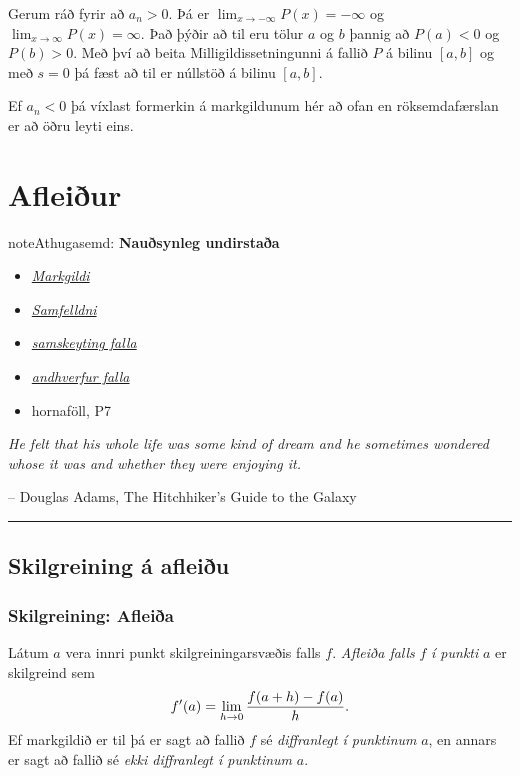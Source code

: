 \documentclass[b5paper,10pt,icelandic]{sphinxmanual}
\begin{document}
Gerum ráð fyrir að \(a_n>0\). Þá er
\(\lim_{x\to -\infty} P(x) = -\infty\) og
\(\lim_{x\to \infty} P(x) = \infty\). Það þýðir að til eru tölur
\(a\) og \(b\) þannig að \(P(a)<0\) og \(P(b)>0\). Með
því að beita Milligildissetningunni á fallið \(P\) á bilinu
\([a,b]\) og með \(s=0\) þá fæst að til er núllstöð á bilinu
\([a,b]\).

Ef \(a_n < 0\) þá víxlast formerkin á markgildunum hér að ofan en röksemdafærslan er
að öðru leyti eins.


\chapter{Afleiður}
\label{kafli03::doc}\label{kafli03:afleiur}
\begin{notice}{note}{Athugasemd:}
\textbf{Nauðsynleg undirstaða}
\begin{itemize}
\item {} 
{\hyperref[kafli02:markgildi]{\emph{Markgildi}}}

\item {} 
{\hyperref[kafli02:samfelldni]{\emph{Samfelldni}}}

\item {} 
{\hyperref[kafli01:samskeyting]{\emph{samskeyting falla}}}

\item {} 
{\hyperref[kafli01:andhverfa]{\emph{andhverfur falla}}}

\item {} 
hornaföll, P7

\end{itemize}
\end{notice}

\emph{He felt that his whole life was some kind of dream and he sometimes wondered whose it was and whether they were enjoying it.}

-- Douglas Adams, The Hitchhiker's Guide to the Galaxy


\bigskip\hrule{}\bigskip



\section{Skilgreining á afleiðu}
\label{kafli03:afleidur}\label{kafli03:skilgreining-a-afleiu}\label{kafli03:index-0}

\subsection{Skilgreining: Afleiða}
\label{kafli03:skilgreining-afleia}
Látum \(a\) vera innri punkt skilgreiningarsvæðis falls \(f\).
\textit{Afleiða falls} \(f\) \emph{í punkti} \(a\) er skilgreind sem
\begin{gather}
\begin{split}f'(a)=\lim_{h\rightarrow 0}\frac{f(a+h)-f(a)}{h}.\end{split}\notag
\end{gather}
Ef markgildið er til þá er sagt að fallið \(f\) sé
\textit{diffranlegt} \emph{í
punktinum} \(a\), en annars er sagt að fallið sé \emph{ekki diffranlegt í
punktinum} \(a\).
\end{document}

